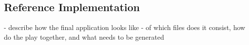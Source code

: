 \subsection{Reference Implementation}

- describe how the final application looks like
- of which files does it consist, how do the play together, and what needs to be generated



